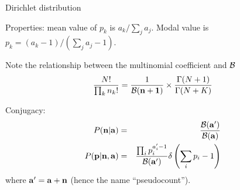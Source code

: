 \documentclass{beamer}
\begin{document}
\begin{frame}{Dirichlet distribution}

\itemb
\item Properties: mean value of $p_k$ is $a_k / \sum_j a_j$. Modal value is $p_k = (a_k-1) / (\sum_j a_j-1)$.
 \item Note the relationship between the multinomial coefficient and ${\cal B}$
\[
\frac{N!}{\prod_k n_k!} = \frac{1}{{\cal B}({\bf n}+{\bf 1})} \times \frac{\Gamma(N+1)}{\Gamma(N+K)}
\]
 \item Conjugacy:
\begin{eqnarray*}
P({\bf n}|{\bf a}) & = & \frac{{\cal B}({\bf a}')}{{\cal B}({\bf a})} \\
P({\bf p}|{\bf n},{\bf a}) & = & \frac{\prod_i p_i^{a'_i-1}}{{\cal B}({\bf a}')} \delta \left( \sum_i p_i - 1 \right)
\end{eqnarray*}
where ${\bf a}' = {\bf a} + {\bf n}$ (hence the name ``pseudocount'').

\end{frame}
\end{document}
